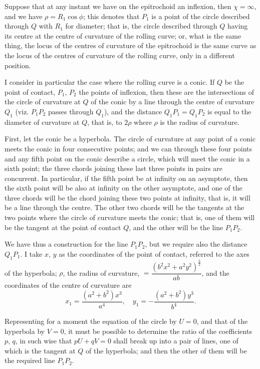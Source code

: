 \documentclass[11pt,a4paper]{article}
\begin{document}
Suppose that at any instant we have on the epitrochoid an inflexion, then $\chi = \infty$, and we have $\rho = R_1\cos\phi$; this denotes that $P_1$ is a point of the circle described through $Q$ with $R_1$ for diameter; that is, the circle described through $Q$ having its centre at the centre of curvature of the rolling curve; or, what is the same thing, the locus of the centres of curvature of the epitrochoid is the same curve as the locus of the centres of curvature of the rolling curve, only in a different position.

I consider in particular the case where the rolling curve is a conic. If $Q$ be the point of contact, $P_1$, $P_2$ the points of inflexion, then these are the intersections of the circle of curvature at $Q$ of the conic by a line through the centre of curvature $Q_1$ (viz. $P_1P_2$ passes through $Q_1$), and the distance $Q_1P_1 = Q_1P_2$ is equal to the diameter of curvature at $Q$, that is, to $2\rho$ where $\rho$ is the radius of curvature.

First, let the conic be a hyperbola. The circle of curvature at any point of a conic meets the conic in four consecutive points; and we can through these four points and any fifth point on the conic describe a circle, which will meet the conic in a sixth point; the three chords joining these last three points in pairs are concurrent. In particular, if the fifth point be at infinity on an asymptote, then the sixth point will be also at infinity on the other asymptote, and one of the three chords will be the chord joining these two points at infinity, that is, it will be a line through the centre. The other two chords will be the tangents at the two points where the circle of curvature meets the conic; that is, one of them will be the tangent at the point of contact $Q$, and the other will be the line $P_1P_2$.

We have thus a construction for the line $P_1P_2$, but we require also the distance $Q_1P_1$. I take $x$, $y$ as the coordinates of the point of contact, referred to the axes of the hyperbola; $\rho$, the radius of curvature, $= \dfrac{(b^2x^2 + a^2y^2)^{\frac{3}{2}}}{ab}$, and the coordinates of the centre of curvature are
\[
x_1 = \frac{(a^2 + b^2)x^3}{a^4}, \quad y_1 = -\frac{(a^2 + b^2)y^3}{b^4}.
\]

Representing for a moment the equation of the circle by $U = 0$, and that of the hyperbola by $V = 0$, it must be possible to determine the ratio of the coefficients $p$, $q$, in such wise that $pU + qV = 0$ shall break up into a pair of lines, one of which is the tangent at $Q$ of the hyperbola; and then the other of them will be the required line $P_1P_2$.
\end{document}
